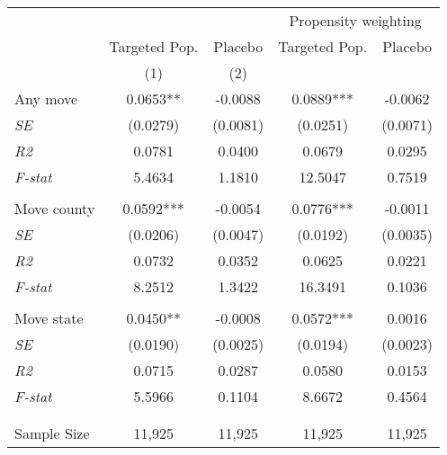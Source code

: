 \begin{tabular}{lcccc}
\toprule
\toprule
 & & & \multicolumn{2}{c}{Propensity weighting}  \\
 & Targeted Pop. & Placebo & Targeted Pop. & Placebo \\
 & (1) & (2)  \\
\midrule 
 Any move & 0.0653** & -0.0088 & 0.0889*** & -0.0062 \\
 \textit{SE} & (0.0279) & (0.0081) & (0.0251) & (0.0071) \\
 \textit{R2} & 0.0781 & 0.0400 & 0.0679 & 0.0295  \\
 \textit{F-stat} & 5.4634 & 1.1810 & 12.5047 & 0.7519  \\
\\
 Move county & 0.0592*** & -0.0054 & 0.0776*** & -0.0011 \\
 \textit{SE} & (0.0206) & (0.0047) & (0.0192) & (0.0035) \\
 \textit{R2} & 0.0732 & 0.0352 & 0.0625 & 0.0221  \\
 \textit{F-stat} & 8.2512 & 1.3422 & 16.3491 & 0.1036  \\
\\
 Move state & 0.0450** & -0.0008 & 0.0572*** & 0.0016 \\
 \textit{SE} & (0.0190) & (0.0025) & (0.0194) & (0.0023) \\
 \textit{R2} & 0.0715 & 0.0287 & 0.0580 & 0.0153  \\
 \textit{F-stat} & 5.5966 & 0.1104 & 8.6672 & 0.4564  \\
\\
\\
Sample Size  & 11,925  & 11,925  & 11,925  & 11,925 \\
\bottomrule
\bottomrule
\end{tabular}